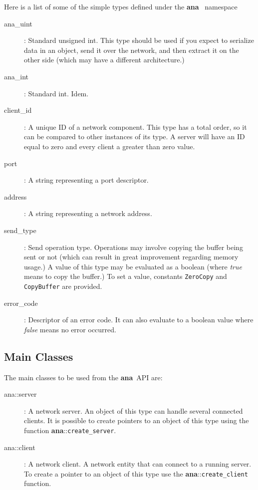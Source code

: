 \documentclass[a4paper,12pt,english]{article}
\newcommand{\ana}{\textbf{ana}}
\begin{document}
Here is  a list  of some of  the simple  types defined under  the \ana
\ namespace

\begin{description}
   \item [ana\_uint] : Standard unsigned int. This type should be used
     if you  expect to serialize data  in an object, send  it over the
     network, and then extract it on  the other side (which may have a
     different architecture.)
   \item [ana\_int] :  Standard int. Idem.
   \item [client\_id] : A unique  ID of a network component. This type
     has a  total order, so it  can be compared to  other instances of
     its type. A server will have an ID equal to zero and every client
     a greater than zero value.
   \item [port] : A string representing a port descriptor.
   \item [address] : A string representing a network address.
   \item [send\_type]  : Send operation type.   Operations may involve
     copying the buffer  being sent or not (which  can result in great
     improvement regarding memory usage.)  A value of this type may be
     evaluated  as a  boolean  (where \emph{true}  means  to copy  the
     buffer.)   To  set   a  value,  constants  \texttt{ZeroCopy}  and
     \texttt{CopyBuffer} are provided.
   \item  [error\_code] :  Descriptor of  an error  code. It  can also
     evaluate  to a boolean  value where  \emph{false} means  no error
     occurred.
\end{description}

\subsection{Main Classes}

The main classes to be used from the \ana \ API are:
\begin{description}

\item[ana::server] :  A network  server.  An object  of this  type can
  handle several connected clients.  It is possible to create pointers
  to    an    object    of    this    type    using    the    function
  \ana::\texttt{create\_server}.

\item[ana::client]  : A  network  client. A  network  entity that  can
  connect to  a running server.  To create a  pointer to an  object of
  this type use the \ana::\texttt{create\_client} function.

\end{description}
\end{document}
